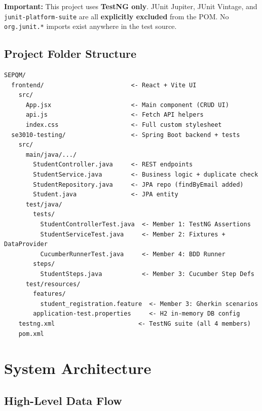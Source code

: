 \documentclass[12pt,a4paper]{article}
\begin{document}
\vspace{0.4cm}
\begin{warnblock}
\textbf{Important:} This project uses \textbf{TestNG only}. JUnit Jupiter,
JUnit Vintage, and \texttt{junit-platform-suite} are all \textbf{explicitly excluded}
from the POM. No \texttt{org.junit.*} imports exist anywhere in the test source.
\end{warnblock}

\subsection{Project Folder Structure}

\begin{lstlisting}[style=shellStyle, numbers=none]
SEPQM/
  frontend/                        <- React + Vite UI
    src/
      App.jsx                      <- Main component (CRUD UI)
      api.js                       <- Fetch API helpers
      index.css                    <- Full custom stylesheet
  se3010-testing/                  <- Spring Boot backend + tests
    src/
      main/java/.../
        StudentController.java     <- REST endpoints
        StudentService.java        <- Business logic + duplicate check
        StudentRepository.java     <- JPA repo (findByEmail added)
        Student.java               <- JPA entity
      test/java/
        tests/
          StudentControllerTest.java  <- Member 1: TestNG Assertions
          StudentServiceTest.java     <- Member 2: Fixtures + DataProvider
          CucumberRunnerTest.java     <- Member 4: BDD Runner
        steps/
          StudentSteps.java           <- Member 3: Cucumber Step Defs
      test/resources/
        features/
          student_registration.feature  <- Member 3: Gherkin scenarios
        application-test.properties     <- H2 in-memory DB config
    testng.xml                       <- TestNG suite (all 4 members)
    pom.xml
\end{lstlisting}

\section{System Architecture}

\subsection{High-Level Data Flow}
\end{document}
